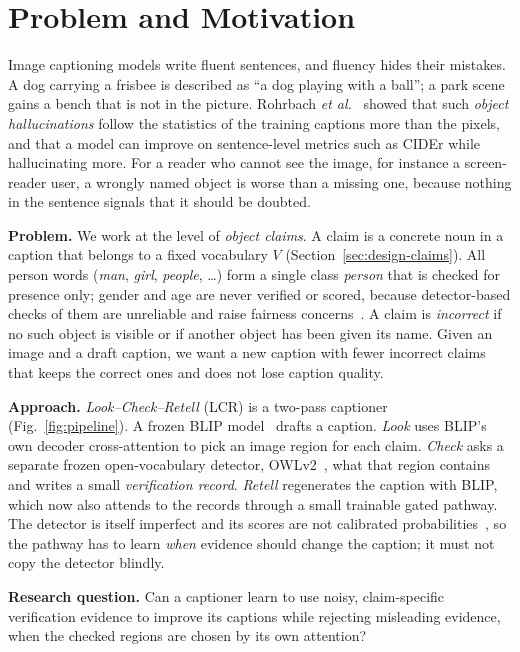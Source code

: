 \section{Problem and Motivation}
\label{sec:intro}

Image captioning models write fluent sentences, and fluency hides their mistakes. A dog carrying a frisbee is described as ``a dog playing with a ball''; a park scene gains a bench that is not in the picture. Rohrbach \emph{et al.}~\cite{rohrbach2018object} showed that such \emph{object hallucinations} follow the statistics of the training captions more than the pixels, and that a model can improve on sentence-level metrics such as CIDEr while hallucinating more. For a reader who cannot see the image, for instance a screen-reader user, a wrongly named object is worse than a missing one, because nothing in the sentence signals that it should be doubted.

\textbf{Problem.} We work at the level of \emph{object claims}. A claim is a concrete noun in a caption that belongs to a fixed vocabulary $V$ (Section~\ref{sec:design-claims}). All person words (\emph{man}, \emph{girl}, \emph{people}, \dots) form a single class \emph{person} that is checked for presence only; gender and age are never verified or scored, because detector-based checks of them are unreliable and raise fairness concerns~\cite{hendricks2018women}. A claim is \emph{incorrect} if no such object is visible or if another object has been given its name. Given an image and a draft caption, we want a new caption with fewer incorrect claims that keeps the correct ones and does not lose caption quality.

\textbf{Approach.} \emph{Look--Check--Retell} (LCR) is a two-pass captioner (Fig.~\ref{fig:pipeline}). A frozen BLIP model~\cite{li2022blip} drafts a caption. \emph{Look} uses BLIP's own decoder cross-attention to pick an image region for each claim. \emph{Check} asks a separate frozen open-vocabulary detector, OWLv2~\cite{minderer2023scaling}, what that region contains and writes a small \emph{verification record}. \emph{Retell} regenerates the caption with BLIP, which now also attends to the records through a small trainable gated pathway. The detector is itself imperfect and its scores are not calibrated probabilities~\cite{guo2017calibration}, so the pathway has to learn \emph{when} evidence should change the caption; it must not copy the detector blindly.

\textbf{Research question.} Can a captioner learn to use noisy, claim-specific verification evidence to improve its captions while rejecting misleading evidence, when the checked regions are chosen by its own attention?

